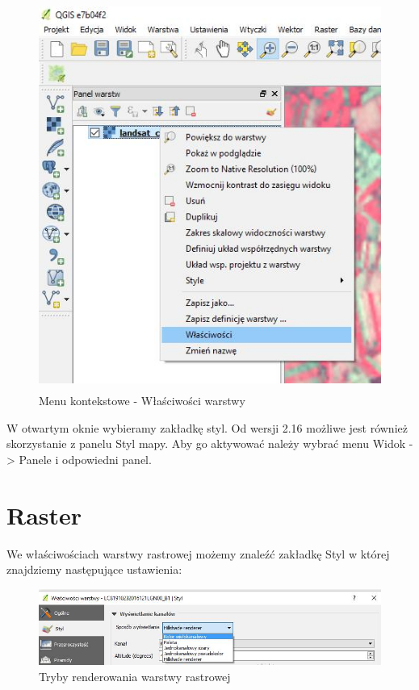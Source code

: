 \documentclass[12pt,a4paper]{book}
\begin{document}
\begin{center}
\begin{figure}
\includegraphics[width=11.596cm,height=12.771cm]{007-kontekstowe.jpg}
\caption{Menu kontekstowe - Właściwości warstwy}
\end{figure}
\end{center}
W otwartym oknie wybieramy zakładkę styl. Od wersji 2.16 możliwe jest również skorzystanie z panelu Styl mapy. Aby go aktywować należy wybrać menu  Widok -{\textgreater} Panele  i odpowiedni panel.

\section{Raster}
We właściwościach warstwy rastrowej możemy znaleźć zakładkę Styl w której znajdziemy następujące ustawienia:

\begin{figure}[ht]
	\centering
	\includegraphics[height=2.5cm]{007-raster-tryby.jpg}
	\caption{Tryby renderowania warstwy rastrowej}
\end{figure}
\end{document}

